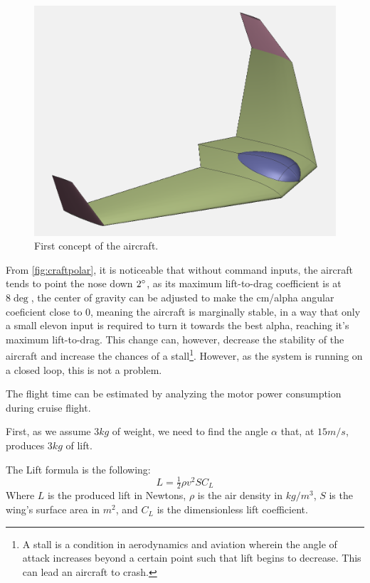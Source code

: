 \begin{figure}
\centering
  \includegraphics[width=\linewidth]{figs/preliminar.png}
  \caption{First concept of the aircraft.}
  \label{fig:preliminar}
\end{figure}


From \ref{fig:craftpolar}, it is noticeable that without command inputs, the aircraft tends to point the nose down $ 2 \degree $, as its maximum lift-to-drag coefficient is at $8 \deg$, the center of gravity can be adjusted to make the cm/alpha angular coeficient close to 0, meaning the aircraft is marginally stable, in a way that only a small elevon input is required to turn it towards the best alpha, reaching it's maximum lift-to-drag. This change can, however, decrease the stability of the aircraft and increase the chances of a stall\footnote{A stall is a condition in aerodynamics and aviation wherein the angle of attack increases beyond a certain point such that lift begins to decrease. This can lead an aircraft to crash.}. However, as the system is running on a closed loop, this is not a problem.

The flight time can be estimated by analyzing the motor power consumption during cruise flight.

First, as we assume $ 3 kg $ of weight, we need to find the angle $\alpha$ that, at $15 m/s$, produces $3kg$ of lift.

The Lift formula is the following:
\begin{equation}
L=\tfrac{1}{2}\rho v^{2}SC_{L}
\end{equation}
Where $L$ is the produced lift in Newtons, $\rho$ is the air density in $kg/m^3$, $S$ is the wing's surface area in $m^2$, and $C_L$ is the dimensionless lift coefficient.

